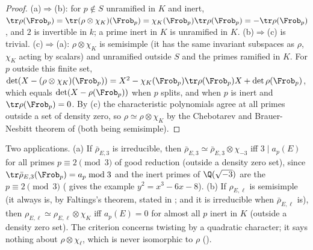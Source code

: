 \begin{proof}
(a)$\Rightarrow$(b): for $p\notin S$ unramified in $K$ and inert, $\tr\rho(\Frob_p)=\tr(\rho\otimes\chi_K)(\Frob_p)=\chi_K(\Frob_p)\tr\rho(\Frob_p)=-\tr\rho(\Frob_p)$, and
$2$ is invertible in $k$; a prime inert in $K$ is unramified in $K$. (b)$\Rightarrow$(c) is trivial. (c)$\Rightarrow$(a): $\rho\otimes\chi_K$ is semisimple (it has
the same invariant subspaces as $\rho$, $\chi_K$ acting by scalars) and unramified outside $S$ and the primes ramified in $K$. For $p$ outside this finite set,
$\det(X-(\rho\otimes\chi_K)(\Frob_p))=X^2-\chi_K(\Frob_p)\tr\rho(\Frob_p)X+\det\rho(\Frob_p)$, which equals $\det(X-\rho(\Frob_p))$ when $p$ splits, and when $p$ is
inert and $\tr\rho(\Frob_p)=0$. By (c) the characteristic polynomials agree at all primes outside a set of density zero, so $\rho\simeq\rho\otimes\chi_K$ by
the Chebotarev and Brauer-Nesbitt theorem of  (both being semisimple).
\end{proof}

Two applications. (a) If $\bar\rho_{E,3}$ is irreducible, then $\bar\rho_{E,3}\simeq\bar\rho_{E,3}\otimes\chi_{-3}$ iff $3\mid a_p(E)$ for all primes $p\equiv2\pmod 3$ of good
reduction (outside a density zero set), since $\tr\bar\rho_{E,3}(\Frob_p)=a_p\bmod3$ and the inert primes of $\Q(\sqrt{-3})$ are the $p\equiv2\pmod3$ (
gives the example $y^2=x^3-6x-8$). (b) If $\rho_{E,\ell}$ is semisimple (it always is, by Faltings's theorem, stated in ; and it is irreducible
when $\bar\rho_{E,\ell}$ is), then $\rho_{E,\ell}\simeq\rho_{E,\ell}\otimes\chi_K$ iff $a_p(E)=0$ for almost all $p$ inert in $K$ (outside a density zero set).
The criterion concerns twisting by a quadratic character; it says nothing about $\rho\otimes\chi_\ell$, which is never isomorphic to $\rho$
().

